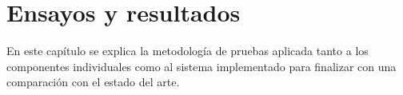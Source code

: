 
\chapter{Ensayos y resultados} %

\label{Chapter4} %

En este capítulo se explica la metodología de pruebas aplicada tanto a los componentes individuales como al sistema implementado para finalizar con una comparación con el estado del arte.


